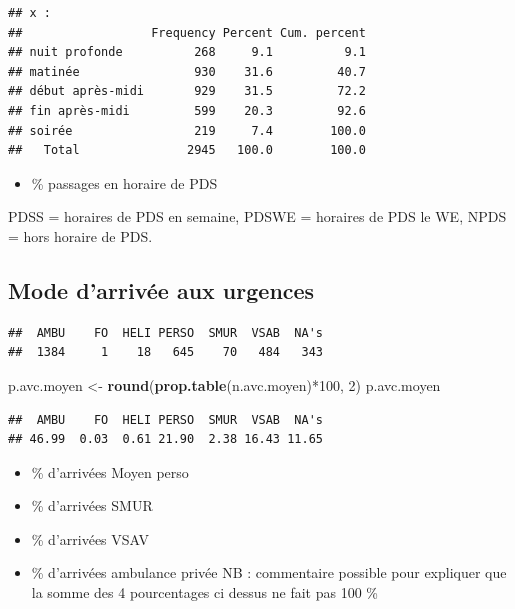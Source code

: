 \documentclass[]{article}
\newenvironment{Shaded}{\begin{snugshade}}{\end{snugshade}}
\newcommand{\KeywordTok}[1]{\textcolor[rgb]{0.13,0.29,0.53}{\textbf{{#1}}}}
\newcommand{\DecValTok}[1]{\textcolor[rgb]{0.00,0.00,0.81}{{#1}}}
\newcommand{\StringTok}[1]{\textcolor[rgb]{0.31,0.60,0.02}{{#1}}}
\newcommand{\NormalTok}[1]{{#1}}
\begin{document}
\begin{verbatim}
## x : 
##                  Frequency Percent Cum. percent
## nuit profonde          268     9.1          9.1
## matinée                930    31.6         40.7
## début après-midi       929    31.5         72.2
## fin après-midi         599    20.3         92.6
## soirée                 219     7.4        100.0
##   Total               2945   100.0        100.0
\end{verbatim}

\begin{itemize}
\itemsep1pt\parskip0pt
\item
  \% passages en horaire de PDS
\end{itemize}

PDSS = horaires de PDS en semaine, PDSWE = horaires de PDS le WE, NPDS =
hors horaire de PDS.

\subsection{Mode d'arrivée aux
urgences}\label{mode-darrivee-aux-urgences}

\begin{Shaded}
\end{Shaded}

\begin{verbatim}
##  AMBU    FO  HELI PERSO  SMUR  VSAB  NA's 
##  1384     1    18   645    70   484   343
\end{verbatim}

\begin{Shaded}
\begin{Highlighting}[]
\NormalTok{p.avc.moyen <-}\StringTok{ }\KeywordTok{round}\NormalTok{(}\KeywordTok{prop.table}\NormalTok{(n.avc.moyen)*}\DecValTok{100}\NormalTok{, }\DecValTok{2}\NormalTok{)}
\NormalTok{p.avc.moyen}
\end{Highlighting}
\end{Shaded}

\begin{verbatim}
##  AMBU    FO  HELI PERSO  SMUR  VSAB  NA's 
## 46.99  0.03  0.61 21.90  2.38 16.43 11.65
\end{verbatim}

\begin{itemize}
\itemsep1pt\parskip0pt
\item
  \% d'arrivées Moyen perso
\item
  \% d'arrivées SMUR
\item
  \% d'arrivées VSAV
\item
  \% d'arrivées ambulance privée NB : commentaire possible pour
  expliquer que la somme des 4 pourcentages ci dessus ne fait pas 100 \%
\end{itemize}
\end{document}
